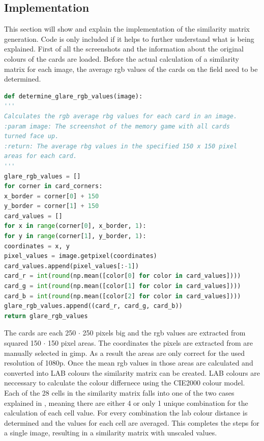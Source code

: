 \subsection{Implementation}
This section will show and explain the implementation of the similarity matrix generation. Code is only included if it helps to further understand what is being explained. First of all the screenshots and the information about the original colours of the cards are loaded. Before the actual calculation of a similarity matrix for each image, the average rgb values of the cards on the field need to be determined. 
\begin{lstlisting}[language=python, caption=Add caption]
def determine_glare_rgb_values(image):
'''
Calculates the rgb average rbg values for each card in an image.
:param image: The screenshot of the memory game with all cards 
turned face up.
:return: The average rbg values in the specified 150 x 150 pixel 
areas for each card. 
'''
glare_rgb_values = []
for corner in card_corners:
x_border = corner[0] + 150
y_border = corner[1] + 150
card_values = []
for x in range(corner[0], x_border, 1):
for y in range(corner[1], y_border, 1):
coordinates = x, y
pixel_values = image.getpixel(coordinates)
card_values.append(pixel_values[:-1])
card_r = int(round(np.mean([color[0] for color in card_values])))
card_g = int(round(np.mean([color[1] for color in card_values])))
card_b = int(round(np.mean([color[2] for color in card_values])))
glare_rgb_values.append((card_r, card_g, card_b))
return glare_rgb_values 
\end{lstlisting}
The cards are each 250 $\cdot$ 250 pixels big and the rgb values are extracted from squared 150 $\cdot$ 150 pixel areas. The coordinates the pixels are extracted from are manually selected in gimp. As a result the areas are only correct for the used resolution of 1080p. Once the mean rgb values in those areas are calculated and converted into LAB colours the similarity matrix can be created. LAB colours are neccessary to calculate the colour differnece using the CIE2000 colour model. Each of the 28 cells in the similarity matrix falls into one of the two cases explained in , meaning there are either 4 or only 1 unique combination for the calculation of each cell value. For every combination the lab colour distance is determined and the values for each cell are averaged. This completes the steps for a single image, resulting in a similarity matrix with unscaled values. 
